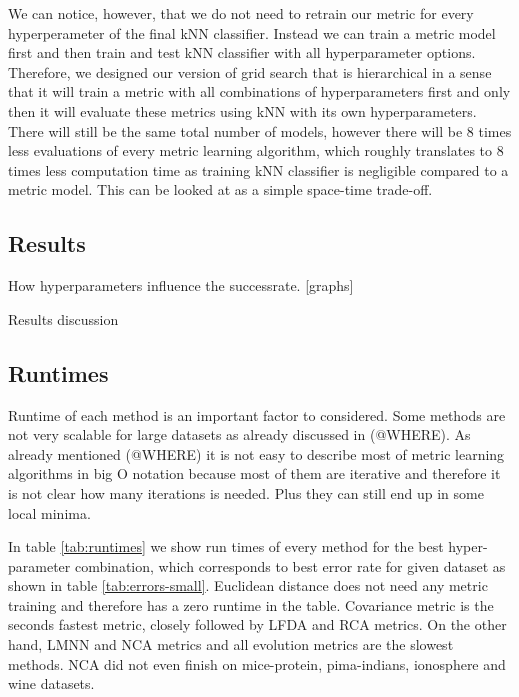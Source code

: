 \documentclass[12pt,a4paper]{report}
\begin{document}
We can notice, however, that we do not need to retrain our metric for every hyperperameter of the final kNN classifier. Instead we can train a metric model first and then train and test kNN classifier with all hyperparameter options. Therefore, we designed our version of grid search that is hierarchical in a sense that it will train a metric with all combinations of hyperparameters first and only then it will evaluate these metrics using kNN with its own hyperparameters. There will still be the same total number of models, however there will be 8 times less evaluations of every metric learning algorithm, which roughly translates to 8 times less computation time as training kNN classifier is negligible compared to a metric model. This can be looked at as a simple space-time trade-off.


\subsection{Results}

How hyperparameters influence the successrate. [graphs] %

Results discussion %



\subsection{Runtimes}

Runtime of each method is an important factor to considered. Some methods are not very scalable for large datasets as already discussed in (@WHERE). As already mentioned (@WHERE) it is not easy to describe most of metric learning algorithms in big O notation because most of them are iterative and therefore it is not clear how many iterations is needed. Plus they can still end up in some local minima.

In table \ref{tab:runtimes} we show run times of every method for the best hyper-parameter combination, which corresponds to best error rate for given dataset as shown in table \ref{tab:errors-small}. Euclidean distance does not need any metric training and therefore has a zero runtime in the table. Covariance metric is the seconds fastest metric, closely followed by LFDA and RCA metrics. On the other hand, LMNN and NCA metrics and all evolution metrics are the slowest methods. NCA did not even finish on mice-protein, pima-indians, ionosphere and wine datasets.
\end{document}
